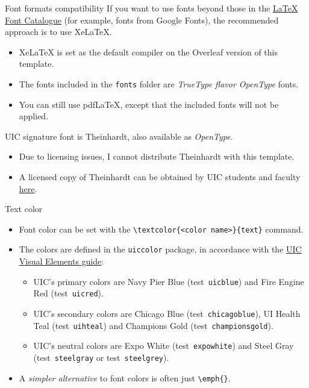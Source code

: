\documentclass{beamer}
\newcommand{\hrefcol}[2]{\textcolor{uihteal}{\href{#1}{#2}}}
\newcommand{\testcolor}[1]{\colorbox{#1}{\textcolor{#1}{test}}~\texttt{#1}}
\begin{document}
\begin{frame}[fragile]{Font formats compatibility}
If you want to use fonts beyond those in the \hrefcol{https://tug.org/FontCatalogue/}{LaTeX Font Catalogue} (for example, fonts from Google Fonts), the recommended approach is to use XeLaTeX.
\begin{itemize}
\item XeLaTeX is set as the default compiler on the Overleaf version of this template.
\item The fonts included in the \verb|fonts| folder are \emph{TrueType flavor OpenType} fonts.
\item You can still use pdfLaTeX, except that the included fonts will not be applied.
\end{itemize}
UIC signature font is Theinhardt, also available as \emph{OpenType}.
\begin{itemize}
\item Due to licensing issues, I cannot distribute Theinhardt with this template.
\item A licensed copy of Theinhardt can be obtained by UIC students and faculty \hrefcol{https://marketing.uic.edu/marketing-toolbox/uic-fonts/}{here}.
\end{itemize}
\end{frame}


\begin{frame}[fragile]{Text color}
\begin{itemize}
\item Font color can be set with the \verb|\textcolor{<color name>}{text}| command.
\item The colors are defined in the \texttt{uiccolor} package, in accordance with the \hrefcol{https://marketing.uic.edu/marketing-toolbox/university-style-guide/visual-elements/}{UIC Visual Elements guide}:
  \begin{itemize}
  \item UIC's primary colors are Navy Pier Blue (\testcolor{uicblue}) and Fire Engine Red (\testcolor{uicred}).
  \item UIC's secondary colors are Chicago Blue (\testcolor{chicagoblue}), UI Health Teal (\testcolor{uihteal}) and Champions Gold (\testcolor{championsgold}).
  \item UIC's neutral colors are Expo White (\testcolor{expowhite}) and Steel Gray (\testcolor{steelgray} or \testcolor{steelgrey}).
  \end{itemize}
\item A \emph{simpler alternative} to font colors is often just \verb|\emph{}|.
\end{itemize}
\end{frame}
\end{document}
